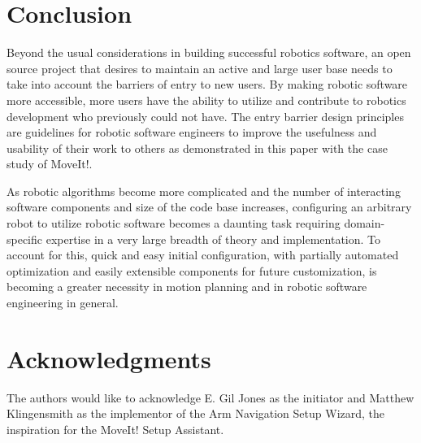 \documentclass[10pt,journal,compsoc]{joser1}
\begin{document}
{%
\section{Conclusion}
\label{sec::conclusion}

Beyond the usual considerations in building successful robotics software, an
open source project that desires to maintain an active and large user base needs
to take into account the barriers of entry to new users. By making robotic
software more accessible, more users have the ability to utilize and contribute
to robotics development who previously could not have. The entry barrier design
principles are guidelines for robotic software engineers to improve the
usefulness and usability of their work to others as demonstrated in this paper
with the case study of MoveIt!.

As robotic algorithms become more complicated and the number of interacting
software components and size of the code base increases, configuring an
arbitrary robot to utilize robotic software becomes a daunting task requiring
domain-specific expertise in a very large breadth of theory and implementation.
To account for this, quick and easy initial configuration, with partially
automated optimization and easily extensible components for future
customization, is becoming a greater necessity in motion planning and in robotic
software engineering in general. 

\section*{Acknowledgments}
The authors would like to acknowledge E. Gil Jones as the initiator and Matthew
Klingensmith as the implementor of the Arm Navigation Setup Wizard, the
inspiration for the MoveIt! Setup Assistant.





}
\end{document}
